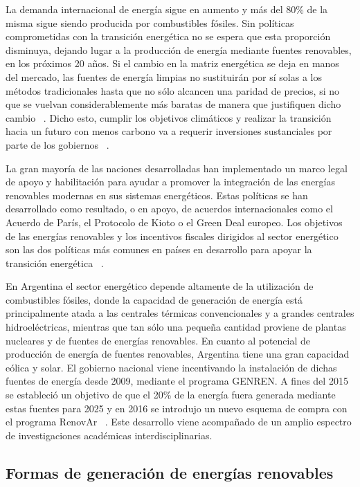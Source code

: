 La demanda internacional de energía sigue en aumento y más del 80\% de la misma
sigue siendo producida por combustibles fósiles. Sin políticas comprometidas con 
la transición energética no se espera que esta proporción disminuya, dejando 
lugar a la producción de energía mediante fuentes renovables, en los próximos 20
años. Si el cambio en la matriz energética se deja en manos del mercado, las 
fuentes de energía limpias no sustituirán por sí solas a los métodos tradicionales
hasta que no sólo alcancen una paridad de precios, si no que se vuelvan 
considerablemente más baratas de manera que justifiquen dicho cambio
~\cite{davidson2019}. Dicho esto, cumplir los objetivos climáticos y realizar la 
transición hacia un futuro con menos carbono va a requerir inversiones 
sustanciales por parte de los gobiernos ~\cite{leonhardt2022}.

La gran mayoría de las naciones desarrolladas han implementado un marco legal de 
apoyo y habilitación para ayudar a promover la integración de las energías 
renovables modernas en sus sistemas energéticos. Estas políticas se han 
desarrollado como resultado, o en apoyo, de acuerdos internacionales como el 
Acuerdo de París, el Protocolo de Kioto o el Green Deal europeo. Los objetivos 
de las energías renovables y los incentivos fiscales dirigidos al sector 
energético son las dos políticas más comunes en países en desarrollo para apoyar 
la transición energética ~\cite{cantarero2020}.

En Argentina el sector energético depende altamente de la utilización de 
combustibles fósiles, donde la capacidad de generación de energía está 
principalmente atada a las centrales térmicas convencionales y a grandes 
centrales hidroeléctricas, mientras que tan sólo una pequeña cantidad proviene 
de plantas nucleares y de fuentes de energías renovables. En cuanto al potencial
de producción de energía de fuentes renovables, Argentina tiene una gran 
capacidad eólica y solar. El gobierno nacional viene incentivando la instalación 
de dichas fuentes de energía desde 2009, mediante el programa GENREN. A fines 
del 2015 se estableció un objetivo de que el 20\% de la energía fuera generada
mediante estas fuentes para 2025 y en 2016 se introdujo un nuevo esquema de 
compra con el programa RenovAr ~\cite{schaube2018}. Este desarrollo viene 
acompañado de un amplio espectro de investigaciones académicas 
interdisciplinarias.

\subsection{Formas de generación de energías renovables}

